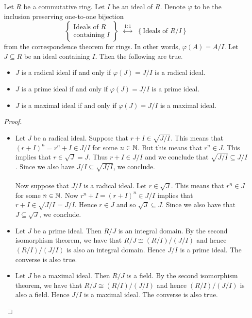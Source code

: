\documentclass[a4paper]{article}
\begin{document}
\begin{thm}{}{} Let $R$ be a commutative ring. Let $I$ be an ideal of $R$. Denote $\varphi$ to be the inclusion preserving one-to-one bijection $$\left\{\substack{\text{Ideals of }R\\\text{containing }I}\right\}\;\;\overset{1:1}{\longleftrightarrow}\;\;\left\{\text{Ideals of }R/I\right\}$$ from the correspondence theorem for rings. In other words, $\varphi(A)=A/I$. Let $J\subseteq R$ be an ideal containing $I$. Then the following are true. 
\begin{itemize}
\item $J$ is a radical ideal if and only if $\varphi(J)=J/I$ is a radical ideal. 
\item $J$ is a prime ideal if and only if $\varphi(J)=J/I$ is a prime ideal. 
\item $J$ is a maximal ideal if and only if $\varphi(J)=J/I$ is a maximal ideal. 
\end{itemize} 
\begin{proof}~\\
\begin{itemize}
\item Let $J$ be a radical ideal. Suppose that $r+I\in\sqrt{J/I}$. This means that $(r+I)^n=r^n+I\in J/I$ for some $n\in\mathbb{N}$. But this means that $r^n\in J$. This implies that $r\in\sqrt{J}=J$. Thus $r+I\in J/I$ and we conclude that $\sqrt{J/I}\subseteq J/I$. Since we also have $J/I\subseteq\sqrt{J/I}$, we conclude. \\~\\

Now suppose that $J/I$ is a radical ideal. Let $r\in\sqrt{J}$. This means that $r^n\in J$ for some $n\in\mathbb{N}$. Now $r^n+I=(r+I)^n\in J/I$ implies that $r+I\in\sqrt{J/I}=J/I$. Hence $r\in J$ and so $\sqrt{J}\subseteq J$. Since we also have that $J\subseteq\sqrt{J}$, we conclude. 

\item Let $J$ be a prime ideal. Then $R/J$ is an integral domain. By the second isomorphism theorem, we have that $R/J\cong(R/I)/(J/I)$ and hence $(R/I)/(J/I)$ is also an integral domain. Hence $J/I$ is a prime ideal. The converse is also true. 

\item Let $J$ be a maximal ideal. Then $R/J$ is a field. By the second isomorphism theorem, we have that $R/J\cong(R/I)/(J/I)$ and hence $(R/I)/(J/I)$ is also a field. Hence $J/I$ is a maximal ideal. The converse is also true. 
\end{itemize}
\end{proof}
\end{thm}
\end{document}
